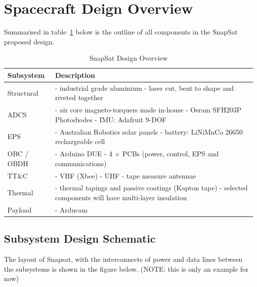 \section{Spacecraft Deign Overview}
Summarised in table~\ref{tab:designoverview} below is the outline of all components in the SnapSat proposed design.

\begin{table}[H]
    \centering
    \caption{SnapSat Design Overview}
    \vspace{0.15cm}
    \label{tab:designoverview}
    {\renewcommand{\arraystretch}{1.4}%
        \begin{tabular}{|>{\arraybackslash}m{3cm}|>{\arraybackslash}m{10cm}|}
            \hline
            \textbf{Subsystem} & \textbf{Description} \\ \hline\hline
            Structural & - industrial grade aluminium \newline - laser cut, bent to shape and riveted together \\\hline
            ADCS & - air core magneto-torquers made in-house \newline - Osram SFH203P Photodiodes \newline - IMU: Adafruit 9-DOF  \\\hline
            EPS & - Australian Robotics solar panels \newline - battery: LiNiMnCo 26650 rechargeable cell  \\\hline
            OBC / OBDH & - Arduino DUE \newline - 4 $\times$ PCBs (power, control, EPS and communications)  \\\hline
           TT\&C & - VHF (Xbee) \newline - UHF \newline - tape measure antennae \\\hline
           Thermal & - thermal tapings and passive coatings (Kapton tape) \newline - selected components will have multi-layer insulation \\\hline
           Payload & - Arducam \\\hline
        \end{tabular} } 
    \end{table}
    
\subsection{Subsystem Design Schematic}
The layout of Snapsat, with the interconnects of power and data lines between the subsystems is shown in the figure below. (NOTE: this is only an example for now)

